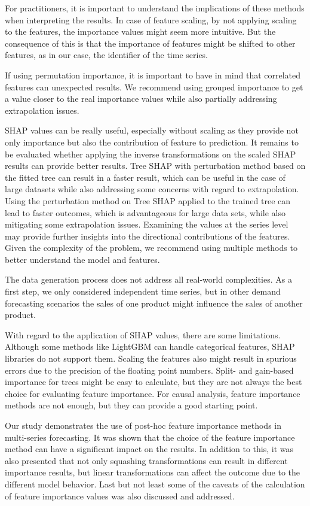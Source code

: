 For practitioners, it is important to understand the implications of these methods when interpreting the results.
In case of feature scaling, by not applying scaling to the features, the importance values might seem more intuitive.
But the consequence of this is that the importance of features might be shifted to other features, as in our case, the identifier of the time series.

If using permutation importance, it is important to have in mind that correlated features can unexpected results.
We recommend using grouped importance to get a value closer to the real importance values while also partially addressing extrapolation issues.

SHAP values can be really useful, especially without scaling as they provide not only importance but also the contribution of feature to prediction.
It remains to be evaluated whether applying the inverse transformations on the scaled SHAP results can provide better results.
Tree SHAP with perturbation method based on the fitted tree can result in a faster result, which can be useful in the case of large datasets while also addressing some concerns with regard to extrapolation.
Using the perturbation method on Tree SHAP applied to the trained tree can lead to faster outcomes, which is advantageous for large data sets, while also mitigating some extrapolation issues.
Examining the values at the series level may provide further insights into the directional contributions of the features.
Given the complexity of the problem, we recommend using multiple methods to better understand the model and features.

The data generation process does not address all real-world complexities.
As a first step, we only considered independent time series, but in other demand forecasting scenarios the sales of one product might influence the sales of another product.

With regard to the application of SHAP values, there are some limitations.
Although some methods like LightGBM can handle categorical features, SHAP libraries do not support them.
Scaling the features also might result in spurious errors due to the precision of the floating point numbers.
Split- and gain-based importance for trees might be easy to calculate, but they are not always the best choice for evaluating feature importance.
For causal analysis, feature importance methods are not enough, but they can provide a good starting point.


Our study demonstrates the use of post-hoc feature importance methods in multi-series forecasting.
It was shown that the choice of the feature importance method can have a significant impact on the results.
In addition to this, it was also presented that not only squashing transformations can result in different importance results, but linear transformations can affect the outcome due to the different model behavior.
Last but not least some of the caveats of the calculation of feature importance values was also discussed and addressed.